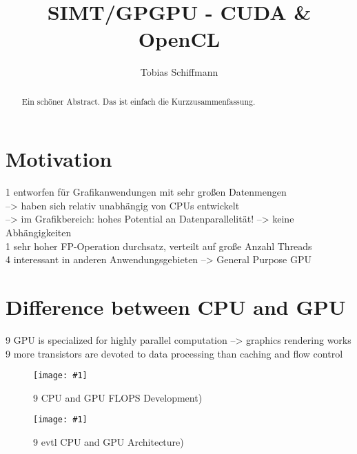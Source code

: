\documentclass[a4paper,12pt]{llncs}
\numberwithin{equation}{section}
\newcommand{\bildbreite}[5]{
  \begin{figure}[htbp]
    \begin{center}
      \texttt{[image: \#1]}
      \caption[#5]{#4}
      \label{#3}
    \end{center}
  \end{figure}
}
\begin{document}


\author{Tobias Schiffmann}

\title{SIMT/GPGPU - CUDA \& OpenCL}

\maketitle

\thispagestyle{empty}

\begin{abstract}
Ein schöner Abstract. Das ist einfach die Kurzzusammenfassung.
\end{abstract}


\section{Motivation}
  1 entworfen für Grafikanwendungen mit sehr großen Datenmengen\\
    --> haben sich relativ unabhängig von CPUs entwickelt\\
    --> im Grafikbereich: hohes Potential an Datenparallelität! --> keine Abhängigkeiten\\
  1 sehr hoher FP-Operation durchsatz, verteilt auf große Anzahl Threads\\
  4 interessant in anderen Anwendungsgebieten --> General Purpose GPU\\
    
    
\section{Difference between CPU and GPU}

  9 GPU is specialized for highly parallel computation --> graphics rendering works
  9 more transistors are devoted to data processing than caching and flow control
  \bildbreite{figures/GPU_CPU_Flops.JPG}{12cm}{fig:GPU_CPU}{9 CPU and GPU FLOPS Development)}{}
    \bildbreite{figures/CPU_GPU_Arc.JPG}{9cm}{fig:GPU_CPU_Arc}{9 evtl CPU and GPU Architecture)}{}
\end{document}
